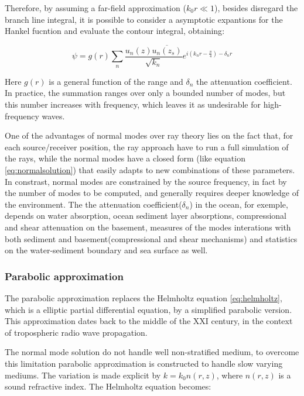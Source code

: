 Therefore, by assuming a far-field approximation ($k_0r \ll 1$), besides
disregard the branch line integral, it is possible to consider a asymptotic expantions for the
Hankel fucntion and evaluate the contour integral, obtaining\cite{Etter2013}:

\begin{equation}
\label{eq:normalsolution}
\psi =
g(r)\sum_n{\frac{u_n(z)\overline{u_n(z_s)}}{\sqrt{k_n}}e^{i(k_nr-\tfrac{\pi}{4})-\delta_nr}}
\end{equation}

Here $g(r)$ is a general function of the range and $\delta_n$ the attenuation
coefficient. In practice, the summation ranges over only a bounded number of
modes, but this number increases with frequency, which leaves it as undesirable
for high-frequency waves. 

One of the advantages of normal modes over ray theory lies on the fact that, for
each source/receiver position, the ray approach have to run a full simulation of
the rays, while the normal modes have a closed form (like equation
\ref{eq:normalsolution}) that easily adapts to new combinations of these
parameters. In constrast, normal modes are constrained by the source frequency,
in fact by the number of modes to be computed, and generally requires deeper
knowledge of the environment. The the attenuation
coefficient($\delta_n$) in the ocean, for exemple, depends on water absorption,
ocean sediment layer absorptions, compressional and shear attenuation on the
basement, measures of the modes interations with both sediment and
basement(compressional and shear mechanisms) and statistics on the
water-sediment boundary and sea surface as well.

\subsubsection{Parabolic approximation}

The parabolic approximation replaces the Helmholtz equation \ref{eq:helmholtz},
which is a elliptic partial differential equation, by a simplified parabolic
version. This approximation dates back to the middle of the $\mathrm{XXI}$
century, in the context of tropospheric radio wave propagation.

The normal mode solution do not handle well non-stratified medium, to overcome
this limitation parabolic approximation is constructed to handle slow varying
mediums. The variation is made explicit by $k = k_0n(r,z)$, where $n(r,z)$ is a
sound refractive index\cite{LURTON}. The Helmholtz equation becomes:

